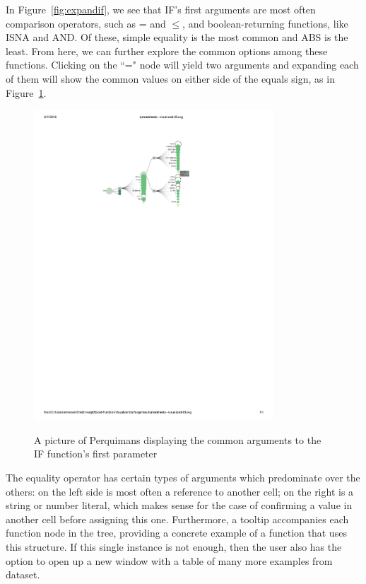 \documentclass[conference]{IEEEtran}
\newcommand{\toolname}{Perquimans\xspace} \newcommand{\toolnameend}{Perquimans}
\begin{document}
	In Figure~\ref{fig:expandif}, we see that IF's first arguments are most often comparison operators,
	such as = and $\le$, and boolean-returning functions, like ISNA and AND. Of these,
	simple equality is the most common and ABS is the least. From here, we
	can further explore the common options among these functions. Clicking on the
	``=" node will yield two arguments and expanding each of them will show
	the common values on either side of the equals sign, as in Figure~\ref{fig:fullpic}. 
	
	\begin{figure}[t] \centering \includegraphics[width=0.8\textwidth]{IFargslabel}
		\caption{A picture of \toolname displaying the common arguments to the IF
			function's first parameter} \centering \label{fig:fullpic} \end{figure}
	
	The equality operator has certain types of arguments
	which predominate over the others: on the left side is most often a reference
	to another cell; on the right is a string or number literal, which makes sense
	for the case of confirming a value in another cell before assigning this one.
	Furthermore, a tooltip accompanies each function node in the tree, providing a
	concrete example of a function that uses this structure. If this single
	instance is not enough, then the user also has the option to open up a new
	window with a table of many more examples from dataset.
	
\end{document}

